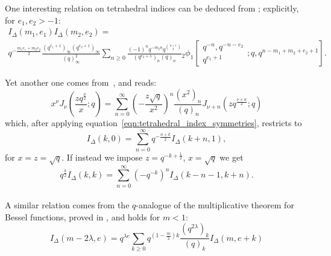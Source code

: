 \documentclass[11pt]{amsart}
\newcommand{\tet}{I_{\Delta}}
\begin{document}
One interesting relation on tetrahedral indices can be deduced from \cite[Eqn~3.1]{swarttouw1992addition}; explicitly, for $e_1,e_2>-1$:
\begin{equation}
\begin{gathered}
\tet\left(m_1,e_1\right) \tet\left(m_2,e_2\right) = \\ q^{-\frac{m_1 e_1 + m_2 e_2}{2}}\frac{ \left(q^{e_1+1}\right)_\infty \left(q^{e_2+1}\right)_\infty}{\left(q\right)^2_\infty}  \sum_{n \ge 0} \frac{\left(-1\right)^n q^{-m_2 n} q^{\binom{n+1}{2}}}{ \left(q^{e_2+1}\right)_n \left(q\right)_n} {_2 \phi_1}\left[\begin{matrix} q^{-n}, q^{-n-e_2}  \\ q^{e_1 +1}  \end{matrix} ; q, q^{n-m_1 +m_2 +e_2 +1} \right].
\end{gathered}
\end{equation}





Yet another one comes from~\cite{koelink1994quantum}, and reads:
\begin{equation}
x^\nu J_\nu \left( \frac{z q^{\frac{\nu}{2}}}{x};q\right) = \sum_{n=0}^\infty \left(- \frac{z \sqrt{q}}{x^2} \right)^n \frac{\left(x^2\right)_n}{\left(q\right)_n} J_{\nu+n} \left(z q^{\frac{\nu+n}{2}};q\right)
\end{equation}
which, after applying equation~\eqref{eqn:tetrahedral_index_symmetries}, restricts to
\begin{equation}
I_\Delta \left(k,0\right) = \sum_{n = 0}^\infty q^{-\frac{n+k}{2}} I_\Delta \left(k+n,1\right) ,
\end{equation}
for $x = z = \sqrt{q}$. If instead we impose $z = q^{-k +\frac12} $, $x = \sqrt{q}$ we get
\begin{equation}\label{eqn:diagonal_term}
q^{\frac{k}{2}} I_\Delta \left(k,k\right) = \sum_{n = 0}^\infty \left(-q^{-k}\right)^n I_\Delta \left(k-n-1,k+n\right).
\end{equation}
~\\
A similar relation comes from the $q$-analogue of the multiplicative theorem for Bessel functions, proved in \cite[Thm.~3.11]{SwarttouwPhD}, and holds for $m<1$:
\begin{equation}
\tet\left(m - 2\lambda,e\right) = q^{\lambda e} \sum_{k \ge 0} q^{\left(1- \frac{m}{2}\right)k} \frac{\left(q^{2\lambda}\right)_k}{\left(q\right)_k} \tet\left(m,e+k\right)
\end{equation}
\end{document}
